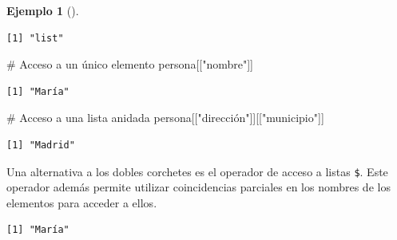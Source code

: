 \documentclass[
  spanish,
  a4paper,
]{scrreport}
\newenvironment{Shaded}{\begin{snugshade}}{\end{snugshade}}
\newcommand{\CommentTok}[1]{\textcolor[rgb]{0.37,0.37,0.37}{#1}}
\newcommand{\DecValTok}[1]{\textcolor[rgb]{0.68,0.00,0.00}{#1}}
\newcommand{\FunctionTok}[1]{\textcolor[rgb]{0.28,0.35,0.67}{#1}}
\newcommand{\NormalTok}[1]{\textcolor[rgb]{0.00,0.23,0.31}{#1}}
\newcommand{\OtherTok}[1]{\textcolor[rgb]{0.00,0.23,0.31}{#1}}
\newcommand{\SpecialCharTok}[1]{\textcolor[rgb]{0.37,0.37,0.37}{#1}}
\newcommand{\StringTok}[1]{\textcolor[rgb]{0.13,0.47,0.30}{#1}}
\theoremstyle{definition}
\theoremstyle{definition}
\newtheorem{example}{Ejemplo}[chapter]
\theoremstyle{remark}
\begin{document}
\begin{example}[]
\begin{verbatim}
[1] "list"
\end{verbatim}

\begin{Shaded}
\begin{Highlighting}[]
\CommentTok{\# Acceso a un único elemento}
\NormalTok{persona[[}\StringTok{"nombre"}\NormalTok{]]}
\end{Highlighting}
\end{Shaded}

\begin{verbatim}
[1] "María"
\end{verbatim}

\begin{Shaded}
\begin{Highlighting}[]
\CommentTok{\# Acceso a una lista anidada}
\NormalTok{persona[[}\StringTok{"dirección"}\NormalTok{]][[}\StringTok{"municipio"}\NormalTok{]]}
\end{Highlighting}
\end{Shaded}

\begin{verbatim}
[1] "Madrid"
\end{verbatim}

\end{example}

Una alternativa a los dobles corchetes es el operador de acceso a listas
\texttt{\$}. Este operador además permite utilizar coincidencias
parciales en los nombres de los elementos para acceder a ellos.

\begin{Shaded}
\end{Shaded}

\begin{verbatim}
[1] "María"
\end{verbatim}
\end{document}
